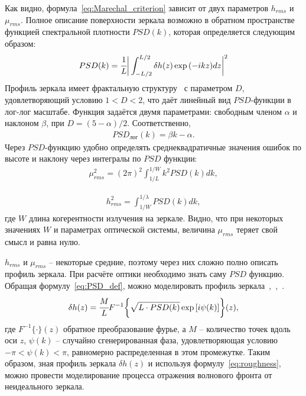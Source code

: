 Как видно, формула~\ref{eq:Marechal_criterion} зависит от двух параметров $h_{rms}$ и $\mu_{rms}$. Полное описание поверхности зеркала возможно в обратном пространстве функцией спектральной плотности $PSD(k)$, которая определяется следующим образом: 
\begin{align}
	PSD(k) =  \cfrac{1}{L} \bigg| \int_{-L/2}^{L/2} \delta h(z) \exp{(-ikz)dz}  \bigg|^2
	\label{eq:PSD_def}
\end{align}
Профиль зеркала имеет фрактальную структуру~\cite{angeisky_fractal_nodate} с параметром $D$, удовлетворяющий условию $1 < D < 2$, что даёт линейный вид $PSD$-функции в лог-лог масштабе. Функция задаётся двумя параметрами: свободным членом $\alpha$ и наклоном $\beta$, при $D = (5 - \alpha)/2$. Соответственно, 
\begin{align}
	PSD_{лог}(k) =  \beta k - \alpha.
\end{align}
Через $PSD$-функцию удобно определять среднеквадратичные значения ошибок по высоте и наклону через интегралы по $PSD$ функции:
\begin{align}
	\mu^2_{rms} =  (2 \pi)^2 \int^{1/W}_{1/L} k^2 PSD(k) dk,
\end{align}

\begin{align}
	h^2_{rms} =  \int^{1/\lambda}_{1/W} PSD(k) dk,
\end{align}
где $W$ длина когерентности излучения на зеркале. Видно, что при некоторых значениях $W$ и параметрах оптической системы, величина $\mu_{rms}$ теряет свой смысл и равна нулю. 

$h_{rms}$ и $\mu_{rms}$ -- некоторые средние, поэтому через них сложно полно описать профиль зеркала. При расчёте оптики необходимо знать саму $PSD$ функцию. Обращая формулу~\ref{eq:PSD_def}, можно моделировать профиль зеркала~\cite{hua_using_2013},~\cite{xu_statistical_2012},~\cite{barty_predicting_2009}.
\begin{align}
	\delta h(z) = \cfrac{M}{L} F^{-1} \bigg\{\sqrt{L \cdot PSD(k)} \exp{[i \psi(k)]} \bigg\}(z),
\end{align}
где $F^{-1}\{\cdot\}(z)$ обратное преобразование фурье, а $M$ -- количество точек вдоль оси $z$, $\psi(k)$ -- случайно сгенерированная фаза, удовлетворяющая условию $-\pi < \psi(k) <\pi$, равномерно распределенная в этом промежутке. Таким образом, зная профиль зеркала $\delta h(z)$ и используя формулу~\ref{eq:roughness}, можно провести моделирование процесса отражения волнового фронта от неидеального зеркала.
\normalsize%
